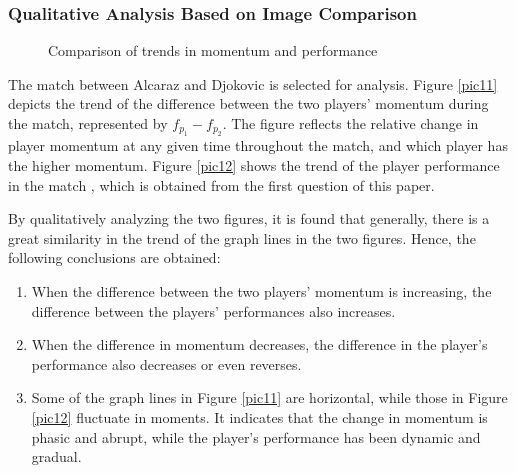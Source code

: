 \documentclass[12pt]{article}  %
\begin{document}
\subsubsection*{Qualitative Analysis Based on Image Comparison}

	\begin{figure}[H]
	\centering
	
	\hfill 
	
	\caption{Comparison of trends in momentum and performance}
	\label{pic11and12}
\end{figure}
\vspace{-0.5cm}

The match between Alcaraz and Djokovic is selected for analysis. Figure \ref{pic11} depicts the trend of the difference between the two players' momentum during the match, represented by $f_{p_1}-f_{p_2}$. The figure reflects the relative change in player momentum at any given time throughout the match, and which player has the higher momentum. Figure \ref{pic12} shows the trend of the player performance in the match , which is obtained from the first question of this paper.

By qualitatively analyzing the two figures, it is found that generally, there is a great similarity in the trend of the graph lines in the two figures. Hence, the following conclusions are obtained:

\begin{enumerate}[\bfseries 1.]
	\setlength{\parsep}{0ex} %
	\setlength{\topsep}{0.5pt} %
	\setlength{\itemsep}{0.5pt} %
	\item When the difference between the two players' momentum is increasing, the difference between the players' performances also increases.
	
	\item When the difference in momentum decreases, the difference in the player's performance also decreases or even reverses. 
	
	\item Some of the graph lines in Figure \ref{pic11} are horizontal, while those in Figure \ref{pic12} fluctuate in moments. It indicates that the change in momentum is phasic and abrupt, while the player's performance has been dynamic and gradual.
\end{enumerate}
\end{document}
